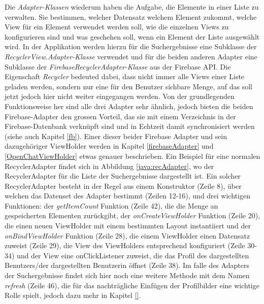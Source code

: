 \documentclass[a4paper,11pt]{report}
\begin{document}
				Die \emph{Adapter-Klassen} wiederum haben die Aufgabe, die Elemente in einer Liste zu verwalten. Sie bestimmen, welcher Datensatz welchem Element zukommt, welche View für ein Element verwendet werden soll, wie die einzelnen Views zu konfigurieren sind und was geschehen soll, wenn ein Element der Liste ausgewählt wird. In der Applikation werden hierzu für die Suchergebnisse eine Subklasse der \emph{RecyclerView.Adapter-Klasse} verwendet und für die beiden anderen Adapter eine Subklasse der \emph{FirebaseRecyclerAdapter-Klasse} aus der Firebase API. Die Eigenschaft \emph{Recycler} bedeuted dabei, dass nicht immer alle Views einer Liste geladen werden, sondern nur eine für den Benutzer sichbare Menge, auf das soll jetzt jedoch hier nicht weiter eingegangen werden. Von der grundlegenden Funktionsweise her sind alle drei Adapter sehr ähnlich, jedoch bieten die beiden Firebase-Adapter den grossen Vorteil, das sie mit einem Verzeichnis in der Firebase-Datenbank verknüpft sind und in Echtzeit damit synchronisiert werden (siehe auch Kapitel \ref{fb}). Einer dieser beider Firebase Adapter und sein dazugehöriger ViewHolder werden in Kapitel \ref{firebaseAdapter} und \ref{OpenChatViewHolder} etwas genauer beschrieben. Ein Beispiel für eine normalen RecyclerAdapter findet sich in Abbildung \ref{java:recAdapter}, wo der RecyclerAdapter für die Liste der Suchergebnisse dargestellt ist. Ein solcher RecyclerAdapter besteht in der Regel aus einem Konstruktor (Zeile 8), über welchen das Datenset des Adapter bestimmt (Zeilen 12-16), und drei wichtigen Funktionen: der \emph{getItemCount} Funktion (Zeile 42), die die Menge an gespeicherten Elementen zurückgibt, der \emph{onCreateViewHolder} Funktion (Zeile 20), die einen neuen ViewHolder mit einem bestimmten Layout instantiiert und der \emph{onBindViewHolder} Funktion (Zeile 28), die einem ViewHolder einen Datensatz zuweist (Zeile 29), die View des ViewHolders entsprechend konfiguriert (Zeile 30-34) und der View eine onClickListener zuweist, die das Profil des dargestellten Benutzers/der dargestellten Benutzerin öffnet (Zeile 38). Im falle des Adapters der Suchergebnisse findet sich hier noch eine weitere Methode mit dem Namen \emph{refresh} (Zeile 46), die für das nachträgliche Einfügen der Profilbilder eine wichtige Rolle spielt, jedoch dazu mehr in Kapitel \ref{}.
				
\end{document}
